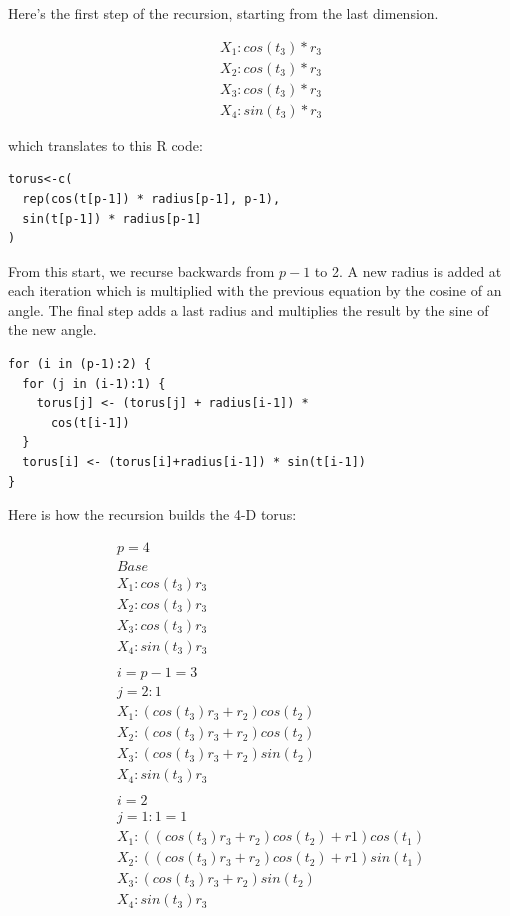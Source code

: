 \documentclass[a4paper]{report}
\begin{document}
\begin{article}
Here's the first step of the recursion, starting from the last
dimension.

\begin{eqnarray*}
&&X_1: cos(t_3)*r_3\\
&&X_2: cos(t_3)*r_3\\
&&X_3: cos(t_3)*r_3\\
&&X_4: sin(t_3)*r_3
\end{eqnarray*}

\noindent which translates to this R code:

\begin{verbatim}
torus<-c(
  rep(cos(t[p-1]) * radius[p-1], p-1), 
  sin(t[p-1]) * radius[p-1]
)
\end{verbatim}

From this start, we recurse backwards from $p-1$ to 2. A new radius is
added at each iteration which is multiplied with the previous equation
by the cosine of an angle. The final step adds a last radius and
multiplies the result by the sine of the new angle. 

\begin{verbatim}
for (i in (p-1):2) {
  for (j in (i-1):1) {
    torus[j] <- (torus[j] + radius[i-1]) * 
      cos(t[i-1])
  }
  torus[i] <- (torus[i]+radius[i-1]) * sin(t[i-1])
}
\end{verbatim}

Here is how the recursion builds the 4-D torus:

\begin{eqnarray*}
&&p=4\\
&&Base\\
&&X_1: cos(t_3)r_3\\
&&X_2: cos(t_3)r_3\\
&&X_3: cos(t_3)r_3\\
&&X_4: sin(t_3)r_3\\
\\
&&i=p-1=3\\
&&j=2:1\\
&&X_1: (cos(t_3)r_3 + r_2)cos(t_2)\\
&&X_2: (cos(t_3)r_3 + r_2)cos(t_2)\\
&&X_3: (cos(t_3)r_3 + r_2)sin(t_2)\\
&&X_4: sin(t_3)r_3\\
\\
&&i=2\\
&&j=1:1=1\\
&&X_1: ((cos(t_3)r_3 + r_2)cos(t_2) + r1)cos(t_1)\\
&&X_2: ((cos(t_3)r_3 + r_2)cos(t_2) + r1)sin(t_1)\\
&&X_3: (cos(t_3)r_3 + r_2)sin(t_2)\\
&&X_4: sin(t_3)r_3\\
\end{eqnarray*}


\end{article}
\end{document}
